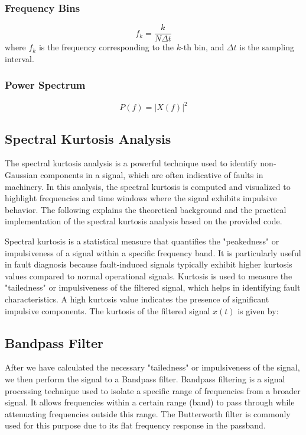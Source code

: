 \documentclass[conference]{IEEEtran}
\begin{document}
\subsubsection{Frequency Bins}
\begin{equation}
f_k = \frac{k}{N \Delta t}
\end{equation}
where \(f_k\) is the frequency corresponding to the \(k\)-th bin, and \(\Delta t\) is the sampling interval.

\subsubsection{Power Spectrum}
\begin{equation}
P(f) = |X(f)|^2
\end{equation}

\subsection{Spectral Kurtosis Analysis}\label{spekur}

The spectral kurtosis analysis is a powerful technique used to identify non-Gaussian components in a signal, which are often indicative of faults in machinery. In this analysis, the spectral kurtosis is computed and visualized to highlight frequencies and time windows where the signal exhibits impulsive behavior. The following explains the theoretical background and the practical implementation of the spectral kurtosis analysis based on the provided code.

Spectral kurtosis is a statistical measure that quantifies the "peakedness" or impulsiveness of a signal within a specific frequency band. It is particularly useful in fault diagnosis because fault-induced signals typically exhibit higher kurtosis values compared to normal operational signals. Kurtosis is used to measure the "tailedness" or impulsiveness of the filtered signal, which helps in identifying fault characteristics. A high kurtosis value indicates the presence of significant impulsive components. The kurtosis of the filtered signal \( x(t) \) is given by:

\subsection{Bandpass Filter}

After we have calculated the necessary "tailedness" or impulsiveness of the signal, we then perform the signal to a Bandpass filter. Bandpass filtering is a signal processing technique used to isolate a specific range of frequencies from a broader signal. It allows frequencies within a certain range (band) to pass through while attenuating frequencies outside this range. The Butterworth filter is commonly used for this purpose due to its flat frequency response in the passband.
\end{document}
